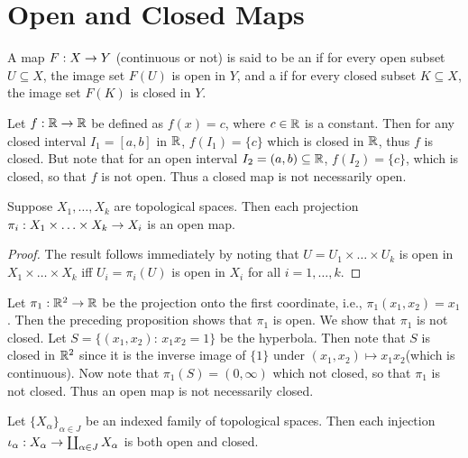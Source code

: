 \documentclass[11pt,a4paper]{article}
\begin{document}
\section{Open and Closed Maps}

\begin{definition}
A map $F:X\rightarrow Y$ (continuous or not) is said to be an  if for every open subset $U\subseteq X$, the image set $F(U)$ is open in $Y$, and a  if for every closed subset $K\subseteq X$, the image set $F(K)$ is closed in $Y$. 
\end{definition}

\begin{example}
Let $f:\mathbb{R}\rightarrow \mathbb{R}$ be defined as $f(x) = c$, where $c\in \mathbb{R}$ is a constant. Then for any closed interval $I_1 = [a,b]$ in $\mathbb{R}$, $f(I_1) = \{c\}$ which is closed in $\mathbb{R}$, thus $f$ is closed. But note that for an open interval $I_2 = (a,b)\subseteq \mathbb{R}$, $f(I_2) = \{c\}$, which is closed, so that $f$ is not open. Thus a closed map is not necessarily open.
\end{example}

\begin{proposition}
Suppose $X_1,\ldots,X_k$ are topological spaces. Then each projection $\pi_i:X_1\times\ldots\times X_k\rightarrow X_i$ is an open map.
\end{proposition}

\begin{proof}
The result follows immediately by noting that $U = U_1\times\ldots\times U_k$ is open in $X_1\times\ldots\times X_k$ iff $U_i = \pi_i(U)$ is open in $X_i$ for all $i = 1,\ldots,k$.
\end{proof}

\begin{example}
Let $\pi_1:\mathbb{R}^2\rightarrow \mathbb{R}$ be the projection onto the first coordinate, i.e., $\pi_1(x_1,x_2) = x_1$. Then the preceding proposition shows that $\pi_1$ is open. We show that $\pi_1$ is not closed. Let $S = \{(x_1,x_2):\,x_1 x_2 = 1\}$ be the hyperbola. Then note that $S$ is closed in $\mathbb{R}^2$ since it is the inverse image of $\{1\}$ under $(x_1,x_2)\mapsto x_1x_2$(which is continuous). Now note that $\pi_1(S) = (0,\infty)$ which not closed, so that $\pi_1$ is not closed. Thus an open map is not necessarily closed.
\end{example}

\begin{proposition}
Let $\{X_\alpha\}_{\alpha\in J}$ be an indexed family of topological spaces. Then each injection $\iota_\alpha:X_\alpha\rightarrow \coprod_{\alpha\in J}X_\alpha$ is both open and closed.
\end{proposition}
\end{document}
